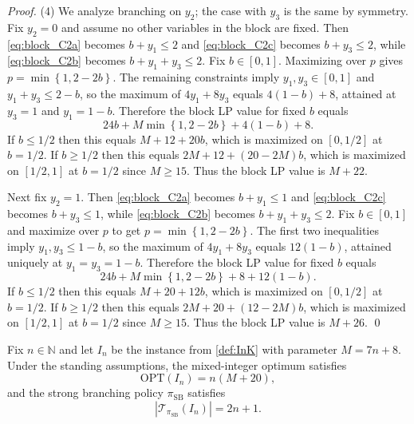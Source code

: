 \documentclass[smallextended,envcountsect]{svjour3} %
\newcommand{\N}{\mathbb{N}}
\newcommand{\set}[1]{\left\{#1\right\}}
\newcommand{\Tcal}{\mathcal{T}}
\newcommand{\0}{\mathbf{0}}
\newcommand{\1}{\mathbf{1}} %
\begin{document}
\begin{proof}
	\smallskip
	(4) We analyze branching on $y_2$; the case with $y_3$ is the same by symmetry.
	Fix $y_2=0$ and assume no other variables in the block are fixed.
	Then \eqref{eq:block_C2a} becomes $b+y_1\le 2$ and \eqref{eq:block_C2c} becomes $b+y_3\le 2$, while
	\eqref{eq:block_C2b} becomes $b+y_1+y_3\le 2$.
	Fix $b\in[0,1]$.
	Maximizing over $p$ gives $p=\min\set{1,2-2b}$.
	The remaining constraints imply $y_1,y_3\in[0,1]$ and $y_1+y_3\le 2-b$, so the maximum of
	$4y_1+8y_3$ equals $4(1-b)+8$, attained at $y_3=1$ and $y_1=1-b$.
	Therefore the block LP value for fixed $b$ equals
	\[
		24b+M\min\set{1,2-2b}+4(1-b)+8.
	\]
	If $b\le 1/2$ then this equals $M+12+20b$, which is maximized on $[0,1/2]$ at $b=1/2$.
		If $b\ge 1/2$ then this equals $2M+12+(20-2M)b$, which is maximized on $[1/2,1]$ at $b=1/2$ since $M\ge 15$.
	Thus the block LP value is $M+22$.

	Next fix $y_2=1$.
	Then \eqref{eq:block_C2a} becomes $b+y_1\le 1$ and \eqref{eq:block_C2c} becomes $b+y_3\le 1$, while
	\eqref{eq:block_C2b} becomes $b+y_1+y_3\le 2$.
	Fix $b\in[0,1]$ and maximize over $p$ to get $p=\min\set{1,2-2b}$.
	The first two inequalities imply $y_1,y_3\le 1-b$, so the maximum of $4y_1+8y_3$ equals $12(1-b)$,
	attained uniquely at $y_1=y_3=1-b$.
	Therefore the block LP value for fixed $b$ equals
	\[
		24b+M\min\set{1,2-2b}+8+12(1-b).
	\]
	If $b\le 1/2$ then this equals $M+20+12b$, which is maximized on $[0,1/2]$ at $b=1/2$.
		If $b\ge 1/2$ then this equals $2M+20+(12-2M)b$, which is maximized on $[1/2,1]$ at $b=1/2$ since $M\ge 15$.
	Thus the block LP value is $M+26$.
\qed
\end{proof}

\begin{lemma}\label{lem:sb_tree_size_InK}
	Fix $n\in\N$ and let $I_n$ be the instance from \cref{def:InK} with parameter $M=7n+8$.
	Under the standing assumptions, the mixed-integer optimum satisfies
	\[
		\mathrm{OPT}(I_n)=n(M+20),
	\]
	and the strong branching policy $\pi_{\mathrm{SB}}$ satisfies
	\[
		|\Tcal_{\pi_{\mathrm{SB}}}(I_n)| = 2n+1.
	\]
\end{lemma}
\end{document}
